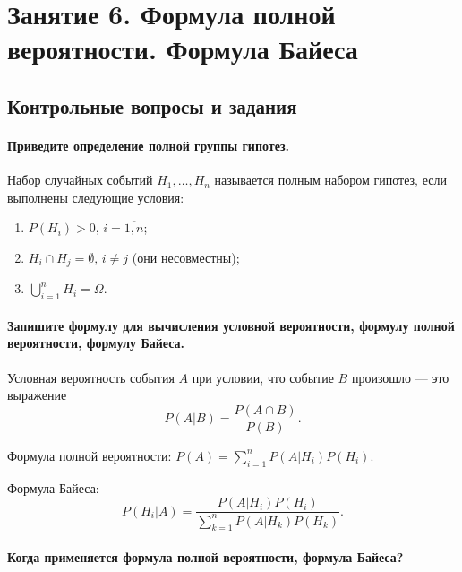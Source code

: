 \chapter*{Занятие 6. Формула полной вероятности. Формула Байеса}

\section*{Контрольные вопросы и задания}

\subsubsection*{Приведите определение полной группы гипотез.}

Набор случайных событий $H_1, \dotsc, H_n$ называется полным набором гипотез, если выполнены следующие условия:
\begin{enumerate}
\item $P \left( H_i \right) > 0, \, i = \overline{1, n} $;
\item $H_i \cap H_j = \emptyset, \, i \neq j$ (они несовместны);
\item $ \bigcup \limits_{i=1}^n H_i = \Omega $.
\end{enumerate}

\subsubsection*{Запишите формулу для вычисления условной вероятности, формулу полной вероятности, формулу Байеса.}

Условная вероятность события $A$ при условии, что событие $B$ произошло --- это выражение
$$P \left( \left. A \right| B \right) =
\frac{P \left( A \cap B \right) }{P \left( B \right) }.$$

Формула полной вероятности: $P \left( A \right) = \sum \limits_{i=1}^n P \left( \left. A \right| H_i \right) P \left( H_i \right) $.

Формула Байеса:
$$P \left( \left. H_i \right| A \right) =
\frac{P \left( \left. A \right| H_i \right) P \left( H_i \right) }{ \sum \limits_{k=1}^n P \left( \left. A \right| H_k \right) P \left( H_k \right) }.$$

\subsubsection*{Когда применяется формула полной вероятности, формула Байеса?}

